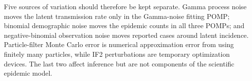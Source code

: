 Five sources of variation should therefore be kept separate.  Gamma process
noise moves the latent transmission rate only in the Gamma-noise fitting POMP;
binomial demographic noise moves the epidemic counts in all three POMPs; and
negative-binomial observation noise moves reported cases around latent
incidence.  Particle-filter Monte Carlo error is numerical approximation error
from using finitely many particles, while IF2 perturbations are temporary
optimization devices.  The last two affect inference but are not components
of the scientific epidemic model.
